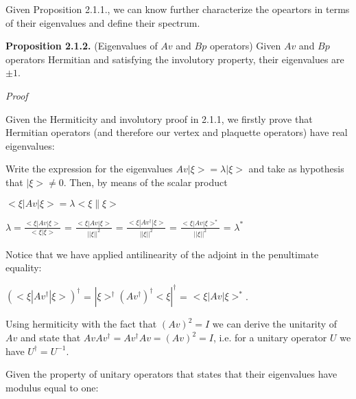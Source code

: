 \documentclass[12pt]{report}
\begin{document}
	
	\begin{minipage}{1\textwidth}
		
		
		Given Proposition 2.1.1., we can know further characterize the opeartors in terms of their eigenvalues and define their spectrum.	\newline
		
		\textbf{Proposition 2.1.2.} (Eigenvalues of $Av$ and $Bp$ operators) Given $Av$ and $Bp$ operators Hermitian and satisfying the involutory property, their eigenvalues are $\pm 1$.
		\newline
		
		\textit{Proof}\newline
		
		Given the Hermiticity and involutory proof in 2.1.1, we firstly prove that Hermitian operators (and therefore our vertex and plaquette operators) have real eigenvalues: \newline
		
		Write the expression for the eigenvalues $Av |\xi> = \lambda |\xi>$ and take as hypothesis that $|\xi> \neq 0$. Then, by means of the scalar product\newline
		
		\begin{center}
			$<\xi|Av|\xi> = \lambda <\xi \| \xi>$\newline
			
			$\lambda = \frac {<\xi|Av|\xi>}{<\xi |\xi>}$ = $\frac {<\xi|Av|\xi>}{||\xi||^2}$ = $\frac {<\xi|Av^{\dagger}|\xi>}{||\xi||^2}$ = $\frac {<\xi|Av|\xi>^*}{||\xi||^2}$ = $\lambda^*$\newline
		\end{center}
		
		Notice that we have applied antilinearity of the adjoint in the penultimate equality: \newline
		
		\begin{center}
			$(<\xi|Av^{\dagger}|\xi>)^{\dagger}$ = $|\xi>^{\dagger} (Av^{\dagger})^{\dagger} <\xi|^{\dagger}$ = $<\xi|Av|\xi>^*$. \newline
		\end{center}
		
		Using hermiticity with the fact that $(Av)^2=I$ we can derive the unitarity of $Av$ and state that $Av Av^{\dagger} = Av^{\dagger} Av = (Av)^2 = I$, i.e. for a unitary operator $U$ we have $U^{\dagger}=U^{-1}$. \newline
		
		Given the property of unitary operators that states that their eigenvalues have modulus equal to one:\newline 
		

\end{minipage}
\end{document}
